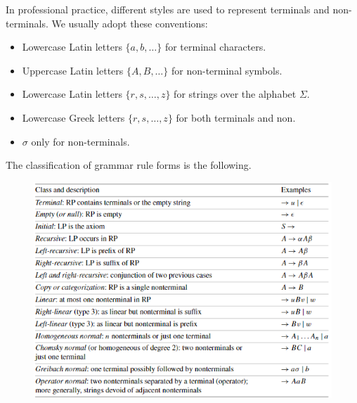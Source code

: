 In professional practice, different styles are used to represent terminals and non-terminals. We usually adopt these conventions: 
\begin{itemize}
    \item Lowercase Latin letters $\{a,b,\dots\}$ for terminal characters. 
    \item Uppercase Latin letters $\{A,B,\dots\}$ for non-terminal symbols. 
    \item Lowercase Latin letters $\{r,s,\dots,z\}$ for strings over the alphabet $\Sigma$. 
    \item Lowercase Greek letters $\{r,s,\dots,z\}$ for both terminals and non. 
    \item $\sigma$ only for non-terminals. 
\end{itemize}
The classification of grammar rule forms is the following. 
\begin{figure}[H]
    \centering
    \includegraphics[width=1\linewidth]{images/grammars.png}
\end{figure}